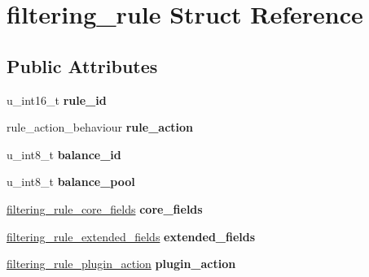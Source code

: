 \hypertarget{structfiltering__rule}{
\section{filtering\_\-rule Struct Reference}
\label{structfiltering__rule}
}
\subsection*{Public Attributes}
\begin{DoxyCompactItemize}
\item 
\hypertarget{structfiltering__rule_a7846f4e5e5ce9c8b30242362fb1fe110}{
u\_\-int16\_\-t {\bfseries rule\_\-id}}
\label{structfiltering__rule_a7846f4e5e5ce9c8b30242362fb1fe110}

\item 
\hypertarget{structfiltering__rule_aba3d6bd048e48660ff4ef75a71618dba}{
rule\_\-action\_\-behaviour {\bfseries rule\_\-action}}
\label{structfiltering__rule_aba3d6bd048e48660ff4ef75a71618dba}

\item 
\hypertarget{structfiltering__rule_a7692c6a4b3262dbefd867eea25c33e22}{
u\_\-int8\_\-t {\bfseries balance\_\-id}}
\label{structfiltering__rule_a7692c6a4b3262dbefd867eea25c33e22}

\item 
\hypertarget{structfiltering__rule_a9077edeb5706cbc6fe064888d60d0900}{
u\_\-int8\_\-t {\bfseries balance\_\-pool}}
\label{structfiltering__rule_a9077edeb5706cbc6fe064888d60d0900}

\item 
\hypertarget{structfiltering__rule_a27f293ca417f5b623f1bae53a89d4f2e}{
\hyperlink{structfiltering__rule__core__fields}{filtering\_\-rule\_\-core\_\-fields} {\bfseries core\_\-fields}}
\label{structfiltering__rule_a27f293ca417f5b623f1bae53a89d4f2e}

\item 
\hypertarget{structfiltering__rule_adaf49d5f2fce1ac0f399412bf62ad65e}{
\hyperlink{structfiltering__rule__extended__fields}{filtering\_\-rule\_\-extended\_\-fields} {\bfseries extended\_\-fields}}
\label{structfiltering__rule_adaf49d5f2fce1ac0f399412bf62ad65e}

\item 
\hypertarget{structfiltering__rule_a915605b2d73969b2ecc8b02f117767bb}{
\hyperlink{structfiltering__rule__plugin__action}{filtering\_\-rule\_\-plugin\_\-action} {\bfseries plugin\_\-action}}
\label{structfiltering__rule_a915605b2d73969b2ecc8b02f117767bb}


\end{DoxyCompactItemize}
